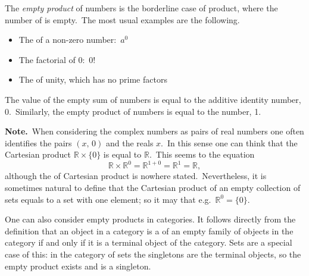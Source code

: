 \documentclass[12pt]{article}
\begin{document}
The {\em empty product} of numbers is the borderline case of product, where the number of  is empty. \,The most usual examples are the following.
\begin{itemize}
\item The  of a non-zero number:\, $a^0$
\item The factorial of 0:\, 0!
\item The  of unity, which has no prime factors
\end{itemize}
The value of the empty sum of numbers is equal to the additive identity number, 0.\, Similarly, the empty product of numbers is equal to the 
 number, 1.

\textbf{Note.}\, When considering the complex numbers as pairs of real numbers one often identifies the pairs $(x,\,0)$ and the reals $x$.\, In this sense one can think that the Cartesian product $\mathbb{R}\times\{0\}$ is equal to $\mathbb{R}$.\, This seems to  the equation
$$\mathbb{R}\times\mathbb{R}^0 = \mathbb{R}^{1+0} = \mathbb{R}^1 = \mathbb{R},$$
although the  of Cartesian product is nowhere stated.\, Nevertheless, it is sometimes natural to define that the Cartesian product of an empty collection of sets equals to a set with one element; so it may  that e.g.\, $\mathbb{R}^0 = \{0\}.$

One can also consider empty products in categories.
It follows directly from the definition that an object in a category
is a 
of an empty family of objects in the category
if and only if it is a terminal object of the category.
Sets are a special case of this:
in the category of sets the singletons are the terminal objects,
so the empty product exists and is a singleton.
\end{document}
